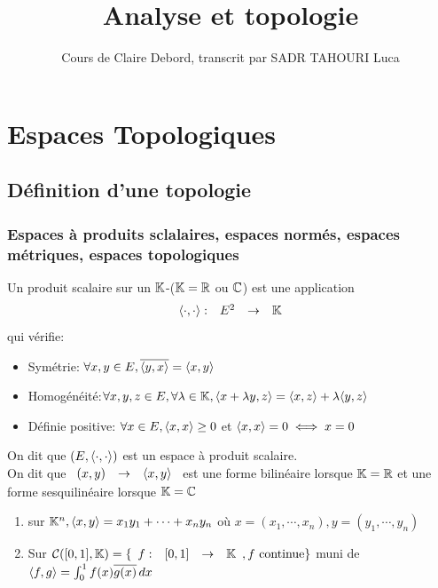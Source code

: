 \documentclass[]{report}
\title{Analyse et topologie}
\author{Cours de Claire Debord, transcrit par SADR TAHOURI Luca}
\date{}
\begin{document}
    \maketitle
    \tableofcontents

    \chapter{Espaces Topologiques}

    \section{Définition d'une topologie}

    \subsection{Espaces à produits sclalaires, espaces normés, espaces métriques, espaces topologiques}

    \begin{df}{}{}
        Un produit scalaire sur un $\mathbb{K}$-\ev($\mathbb{K}=\mathbb{R}$ ou $\mathbb{C}$) est une application \[\begin{array}{ccccc} \langle\cdot , \cdot \rangle : & E^2 & \to & \mathbb{K} \end{array}\]
        qui vérifie: \begin{itemize}
            \item Symétrie: $\forall x,y\in E, \overline{\langle y,x \rangle}=\langle x,y \rangle$
            \item Homogénéité:$\forall x,y,z\in E,\forall \lambda\in \mathbb{K}, \langle x+\lambda y,z \rangle=\langle x,z \rangle+\lambda\langle y,z \rangle$
            \item Définie positive: $\forall x\in E, \langle x,x \rangle\ge 0$ et $\langle x,x \rangle=0\iff x=0$
        \end{itemize}
        On dit que $(E,\langle \cdot,\cdot \rangle)$ est un espace à produit scalaire.\\
        On dit que $\begin{array}{ccccc} (x,y) & \to & \langle x,y \rangle \end{array}$ est une forme bilinéaire lorsque $\mathbb{K}=\mathbb{R}$ et une forme sesquilinéaire lorsque $\mathbb{K}=\mathbb{C}$
    \end{df}

    \begin{ex}{}{}
        \begin{enumerate}
            \item sur $\mathbb{K}^n, \langle x,y \rangle=x_1 y_1+\cdots +x_n y_n$ où $x=(x_1,\cdots,x_n),y=(y_1,\cdots,y_n)$
            \item Sur $\mathcal{C}([0,1],\mathbb{K})=\{\begin{array}{ccccc} f : & [0,1] & \to & \mathbb{K} \end{array},f \text{ continue} \}$ muni de $\langle f,g \rangle=\int_{0}^{1} f(x)\overline{g(x)}\, dx$
        \end{enumerate}
    \end{ex}
\end{document}
